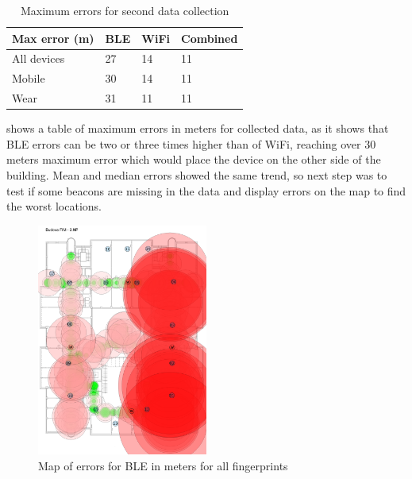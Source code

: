 \begin{table}[h]
	\begin{center}
		\begin{tabular}{ l C{2cm} C{2cm} C{2cm} }
			\hline
			Max error (m) & BLE & WiFi & Combined \\ 
			\hline
			All devices & 27 & 14 & 11 \\ 
			Mobile & 30 & 14 & 11 \\ 
			Wear & 31 & 11 & 11 \\ 
			\hline
		\end{tabular}
		\caption{Maximum errors for second data collection}
		\label{tab01c06}
	\end{center}
\end{table} 

 shows a table of maximum errors in meters for collected data, as it shows that BLE errors can be two or three times higher than of WiFi, reaching over 30 meters maximum error which would place the device on the other side of the building. Mean and median errors showed the same trend, so next step was to test if some beacons are missing in the data and display errors on the map to find the worst locations.

\begin{figure}[H]
	\begin{centering}
		\includegraphics[width=0.5\textwidth]{img/second_data_collection_errors}
		\par\end{centering}
	\caption{Map of errors for BLE in meters for all fingerprints}
	\label{fig02c06}
\end{figure}

